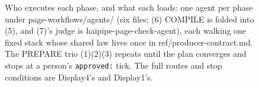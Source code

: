 \begin{figure}[t]
  \centering
  
  \caption{Who executes each phase, and what each loads: one agent per phase
  under page-workflows/agents/ (six files; (6) COMPILE is folded into (5), and
  (7)'s judge is haipipe-page-check-agent), each walking one fixed stack whose
  shared law lives once in ref/producer-contract.md. The PREPARE trio
  (1)(2)(3) repeats until the plan converges and stops at a person's
  \texttt{approved:} tick. The full routes and stop conditions are Display4's
  and Display1's.}
  \label{fig:qpw00-agents-and-skills}
\end{figure}
